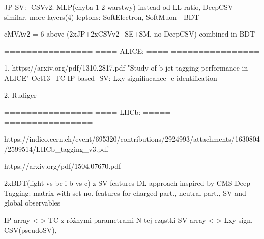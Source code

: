 JP
SV:
-CSVv2: MLP(chyba 1-2 warstwy) instead od LL ratio, DeepCSV - similar, more layers(4)
leptons:
SoftElectron, SoftMuon - BDT

cMVAv2 = 6 above (2xJP+2xCSVv2+SE+SM, no DeepCSV) combined in BDT



================
==== ALICE: ====
================

1.
https://arxiv.org/pdf/1310.2817.pdf
"Study of b-jet tagging performance in ALICE" Oct13
-TC-IP based
-SV: Lxy signifiacance
-e identification

2. Rudiger



================
==== LHCb: =====
================


https://indico.cern.ch/event/695320/contributions/2924993/attachments/1630804/2599514/LHCb_tagging_v3.pdf

https://arxiv.org/pdf/1504.07670.pdf

2xBDT(light-vs-bc i b-vs-c) z SV-features
DL approach inspired by CMS Deep Tagging: matrix with set no. features for charged part., neutral part., SV and global observables





IP array  <-> TC z różnymi parametrami N-tej cząstki
SV array <-> Lxy sign, CSV(pseudoSV), 
